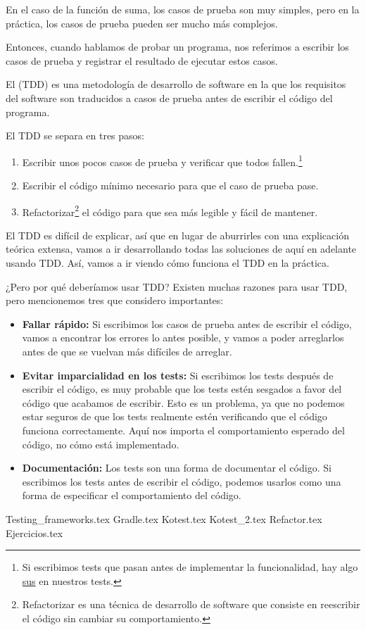   En el caso de la función de suma, los casos de prueba son muy simples, pero en la práctica, los
  casos de prueba pueden ser mucho más complejos.

  Entonces, cuando hablamos de probar un programa, nos referimos a escribir los casos de prueba y
  registrar el resultado de ejecutar estos casos.

  \begin{defaultbox}
    El  (TDD) es una metodología de desarrollo de software en la que
    los requisitos del software son traducidos a casos de prueba antes de escribir el código del
    programa.
  \end{defaultbox}

  El TDD se separa en tres pasos:

  \begin{enumerate}
    \item Escribir unos pocos casos de prueba y verificar que todos fallen.\footnote{
        Si escribimos tests que pasan antes de implementar la funcionalidad, hay algo 
        \href{https://www.merriam-webster.com/words-at-play/what-does-sus-mean}{sus} en nuestros 
        tests.
      }
    \item Escribir el código mínimo necesario para que el caso de prueba pase.
    \item Refactorizar\footnote{
      Refactorizar es una técnica de desarrollo de software que consiste en reescribir el código sin 
      cambiar su comportamiento.
    } el código para que sea más legible y fácil de mantener.
  \end{enumerate}

  El TDD es difícil de explicar, así que en lugar de aburrirles con una explicación teórica extensa,
  vamos a ir desarrollando todas las soluciones de aquí en adelante usando TDD.
  Así, vamos a ir viendo cómo funciona el TDD en la práctica.

  ¿Pero por qué deberíamos usar TDD?
  Existen muchas razones para usar TDD, pero mencionemos tres que considero importantes:

  \begin{itemize}
    \item \textbf{Fallar rápido:} Si escribimos los casos de prueba antes de escribir el código, vamos a
      encontrar los errores lo antes posible, y vamos a poder arreglarlos antes de que se vuelvan
      más difíciles de arreglar.
    \item \textbf{Evitar imparcialidad en los tests:} Si escribimos los tests después de escribir el código,
      es muy probable que los tests estén sesgados a favor del código que acabamos de escribir.
      Esto es un problema, ya que no podemos estar seguros de que los tests realmente estén
      verificando que el código funciona correctamente.
      Aquí nos importa el comportamiento esperado del código, no cómo está implementado.
    \item \textbf{Documentación:} Los tests son una forma de documentar el código.
      Si escribimos los tests antes de escribir el código, podemos usarlos como una forma de
      especificar el comportamiento del código.
  \end{itemize}

  {Testing_frameworks.tex}
  {Gradle.tex}
  {Kotest.tex}
  {Kotest_2.tex}
  {Refactor.tex}
  {Ejercicios.tex}
  \printbibliography[keyword=tdd]